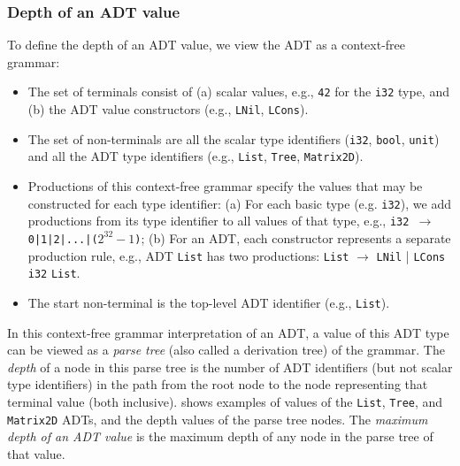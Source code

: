 \subsubsection{Depth of an ADT value}
To define the depth of an ADT value,
we view the ADT as a context-free grammar:
\begin{itemize}
\item The set of terminals
consist of (a) scalar values, e.g., {\tt 42} for the {\tt i32} type, and
(b) the ADT value constructors (e.g., {\tt LNil}, {\tt LCons}).
\item The set of non-terminals are all the scalar type identifiers ({\tt i32}, {\tt bool}, {\tt unit})
and all the ADT type identifiers (e.g., {\tt List}, {\tt Tree}, {\tt Matrix2D}).
\item Productions of this context-free grammar specify the values that may be constructed for each type identifier: (a) For each basic type (e.g. {\tt i32}), we add productions from its type identifier to all values of that type, e.g., {\tt i32 $\rightarrow$ 0|1|2|...|($2^{32}-1$)};
(b) For an ADT, each constructor represents a separate production rule,
e.g., ADT {\tt List} has two productions: {\tt List} $\rightarrow$ {\tt LNil} | {\tt LCons} {\tt i32} {\tt List}.
\item The start non-terminal is the top-level ADT identifier (e.g., {\tt List}).
\end{itemize}
In this context-free grammar interpretation of an ADT, a value of this ADT type
can be viewed as a {\em parse tree} (also called a derivation tree) of the
grammar.
The {\em depth} of a node in this parse tree is the number
of ADT identifiers (but not scalar type identifiers) in the
path from the root node to the node representing that terminal value (both inclusive).
 shows examples of values of the {\tt List}, {\tt Tree},
and {\tt Matrix2D} ADTs, and the depth values of the parse tree nodes.
The {\em maximum depth of an ADT value} is the maximum depth of any node
in the parse tree of that value.

